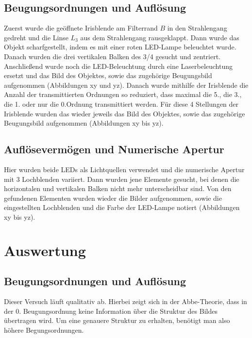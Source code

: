 \documentclass{article}
\begin{document}
\subsection{Beugungsordnungen und Auflösung}


Zuerst wurde die geöffnete Irisblende am Filterrand $B$ in den Strahlengang gedreht und die Linse $L_3$ aus dem Strahlengang rausgeklappt. Dann wurde das Objekt scharfgestellt, indem es mit einer roten LED-Lampe beleuchtet wurde. Danach wurden die drei vertikalen Balken des 3/4 gesucht und zentriert. Anschließend wurde noch die LED-Beleuchtung durch eine Laserbeleuchtung ersetzt und das Bild des Objektes, sowie das zugehörige Beugungsbild aufgenommen (Abbildungen xy und yz).
Danach wurde mithilfe der Irisblende die Anzahl der transmittierten Ordnungen so reduziert, dass maximal die 5., die 3., die 1. oder nur die 0.Ordnung transmittiert werden. Für diese 4 Stellungen der Irisblende wurden das wieder jeweils das Bild des Objektes, sowie das zugehörige Beugungsbild aufgenommen (Abbildungen xy bis yz).
\newpage


\subsection{Auflösevermögen und Numerische Apertur}



Hier wurden beide LEDs als Lichtquellen verwendet und die numerische Apertur mit 3 Lochblenden variiert. Dann wurden jene Elemente gesucht, bei denen die horizontalen und vertikalen Balken nicht mehr unterscheidbar sind. Von den gefundenen Elementen wurden wieder die Bilder aufgenommen, sowie die eingestellten Lochblenden und die Farbe der LED-Lampe notiert (Abbildungen xy bis yz).

\newpage



\section{Auswertung}

\subsection{Beugungsordnungen und Auflösung}

Dieser Versuch läuft qualitativ ab. Hierbei zeigt sich in der Abbe-Theorie, dass in der 0. Beugungsordnung keine Information über die Struktur des Bildes übertragen wird. Um eine genauere Struktur zu erhalten, benötigt man also höhere Begungsordnungen.
\end{document}
